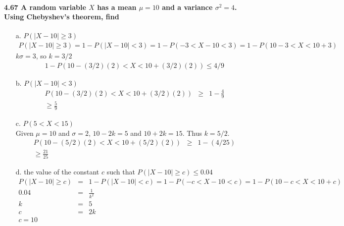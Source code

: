 \documentclass{article}
\begin{document}
\paragraph{4.67 A random variable $X$ has a mean $\mu=10$ and a variance $
\sigma^2=4$. Using Chebyshev's theorem, find}
\begin{enumerate}
\item[a.] $P(|X-10|\geq 3)$
\begin{eqnarray*}
P(|X-10|\geq 3) = 1-P(|X-10|<3)=1-P(-3<X-10<3)=1-P(10-3<X<10+3)
\end{eqnarray*}
$k\sigma=3$, so $k=3/2$
\begin{eqnarray*}
1-P(10-(3/2)(2)<X<10+(3/2)(2))\boxed{\leq 4/9}
\end{eqnarray*}

\item[b.] $P(|X-10|<3)$
\begin{eqnarray*}
P(10-(3/2)(2)<X<10+(3/2)(2)) & \geq & 1-\frac{4}{9}\\
				\boxed{\geq \frac{5}{9}}
\end{eqnarray*}

\item[c.] $P(5<X<15)$\\
Given $\mu=10$ and $\sigma=2$, $10-2k=5$ and $10+2k=15$. Thus $k=5/2$.
\begin{eqnarray*}
P(10-(5/2)(2)<X<10+(5/2)(2)) & \geq & 1-(4/25)\\
				\boxed{\geq \frac{21}{25}}
\end{eqnarray*}

\item[d.] the value of the constant $c$ such that $P(|X-10|\geq c)\leq 0.04$
\begin{eqnarray*}
P(|X-10|\geq c) & = & 1-P(|X-10|<c)=1-P(-c<X-10<c)=1-P(10-c<X<10+c)\\
0.04 & = & \frac{1}{k^2}\\
	k & = & 5\\
	c & = & 2k\\
	\boxed{c=10}
\end{eqnarray*}
\end{enumerate}
\end{document}
